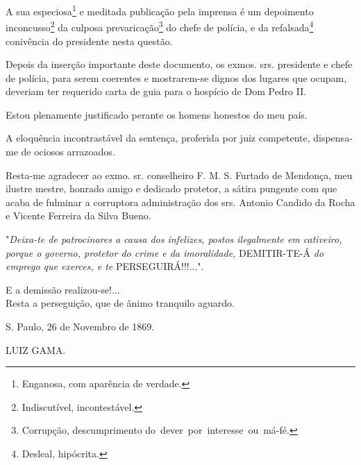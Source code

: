 A sua especiosa\footnote{Enganosa, com aparência de verdade.} e
meditada publicação pela imprensa é um depoimento inconcusso\footnote{
  Indiscutível, incontestável.} da culposa prevaricação\footnote{
  Corrupção, descumprimento do~dever~por~interesse~ou~má-fé.} do chefe
de polícia, e da refalsada\footnote{Desleal, hipócrita.}
conivência do presidente
nesta questão.

Depois da inserção importante deste documento, os exmos. srs. presidente
e chefe de polícia, para serem coerentes e mostrarem-se dignos dos
lugares que ocupam, deveriam ter requerido carta de guia para o hospício
de Dom Pedro II.

Estou plenamente justificado perante os homens honestos do meu país.

A eloquência incontrastável da sentença, proferida por juiz competente,
dispensa-me de ociosos arrazoados.

Resta-me agradecer ao exmo. sr. conselheiro F. M. S. Furtado de
Mendonça, meu ilustre mestre, honrado amigo e dedicado protetor, a
sátira pungente com que acaba de fulminar a corruptora administração dos
srs. Antonio Candido da Rocha e Vicente Ferreira da Silva Bueno.

"\emph{Deixa-te de patrocinares a causa dos infelizes, postos
ilegalmente em cativeiro, porque o governo, protetor do crime e da
imoralidade,} DEMITIR-TE-Á \emph{do emprego que exerces, e te}
PERSEGUIRÁ!!!...".

E a demissão realizou-se!...\\
Resta a perseguição, que de ânimo tranquilo aguardo.

S. Paulo, 26 de Novembro de 1869.

LUIZ GAMA.

\pagebreak
\mbox{}\vfill
\thispagestyle{empty}

